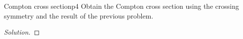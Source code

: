 \begin{problem}{Compton cross section}{p4}
   Obtain the Compton cross section using the crossing symmetry and the result of the previous problem.
\end{problem}
\begin{proof}[Solution]
    
\end{proof}
